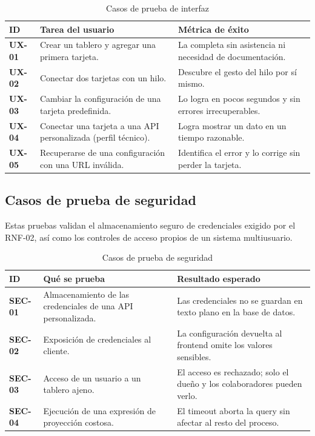 \begin{table}[H]
  \centering
  \renewcommand{\arraystretch}{1.2}
  \begin{tabularx}{\textwidth}{>{\bfseries}l X X}
    \toprule
    ID & Tarea del usuario & Métrica de éxito \\
    \midrule
    UX-01 & Crear un tablero y agregar una primera tarjeta. & La completa sin asistencia ni necesidad de documentación. \\
    UX-02 & Conectar dos tarjetas con un hilo. & Descubre el gesto del hilo por sí mismo. \\
    UX-03 & Cambiar la configuración de una tarjeta predefinida. & Lo logra en pocos segundos y sin errores irrecuperables. \\
    UX-04 & Conectar una tarjeta a una API personalizada (perfil técnico). & Logra mostrar un dato en un tiempo razonable. \\
    UX-05 & Recuperarse de una configuración con una URL inválida. & Identifica el error y lo corrige sin perder la tarjeta. \\
    \bottomrule
  \end{tabularx}
  \caption{Casos de prueba de interfaz}
  \label{tab:cp_ux}
\end{table}

\subsection{Casos de prueba de seguridad}
Estas pruebas validan el almacenamiento seguro de credenciales exigido por el RNF-02, así como los controles de acceso propios de un sistema multiusuario.

\begin{table}[H]
  \centering
  \renewcommand{\arraystretch}{1.2}
  \begin{tabularx}{\textwidth}{>{\bfseries}l X X}
    \toprule
    ID & Qué se prueba & Resultado esperado \\
    \midrule
    SEC-01 & Almacenamiento de las credenciales de una API personalizada. & Las credenciales no se guardan en texto plano en la base de datos. \\
    SEC-02 & Exposición de credenciales al cliente. & La configuración devuelta al frontend omite los valores sensibles. \\
    SEC-03 & Acceso de un usuario a un tablero ajeno. & El acceso es rechazado; solo el dueño y los colaboradores pueden verlo. \\
    SEC-04 & Ejecución de una expresión de proyección costosa. & El timeout aborta la query sin afectar al resto del proceso. \\
    \bottomrule
  \end{tabularx}
  \caption{Casos de prueba de seguridad}
  \label{tab:cp_seguridad}
\end{table}

